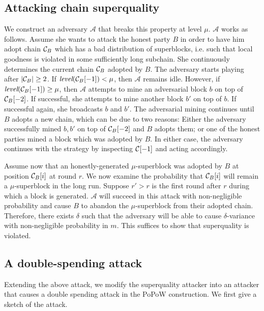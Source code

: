 \subsection{Attacking chain superquality}
\label{subsec.superquality-attack}
We construct an adversary $\mathcal{A}$ that breaks this property at level $\mu$.
$\mathcal{A}$ works as follows. Assume she wants to attack the honest party $B$
in order to have him adopt chain $\mathcal{C}_B$ which has a bad distribution of
superblocks, i.e. such that local goodness is violated in some sufficiently long
subchain. She continuously determines the current chain $\mathcal{C}_B$ adopted by
$B$. The adversary starts playing after $|\mathcal{C}_B| \geq 2$. If
$\textit{level}(\mathcal{C}_B[-1]) < \mu$, then $\mathcal{A}$ remains idle. However,
if $\textit{level}(\mathcal{C}_B[-1]) \geq \mu$, then $\mathcal{A}$ attempts to mine
an adversarial block $b$ on top of $\mathcal{C}_B[-2]$. If successful,  she attempts
to mine another block $b'$ on top of $b$. If successful again, she broadcasts
$b$ and $b'$. The adversarial mining continues until $B$ adopts a new chain,
which can be due to two reasons: Either the adversary successfully mined $b, b'$
on top of $\mathcal{C}_B[-2]$ and $B$ adopts them; or one of the honest parties mined
a block which was adopted by $B$. In either case, the adversary continues with
the strategy by inspecting $\mathcal{C}[-1]$ and acting accordingly.

Assume now that an honestly-generated $\mu$-superblock was adopted by $B$ at
position $\mathcal{C}_B[i]$ at round $r$. We now examine the probability that
$\mathcal{C}_B[i]$ will remain a $\mu$-superblock in the long run. Suppose $r' > r$
is the first round after $r$ during which a block is generated. $\mathcal{A}$
will succeed in this attack with non-negligible probability and cause $B$ to
abandon the $\mu$-superblock from their adopted chain. Therefore, there
exists $\delta$ such that the adversary will be able to cause $\delta$-variance
with non-negligible probability in $m$. This suffices to show that superquality
is violated.

\subsection{A double-spending attack}
Extending the above attack, we modify the superquality attacker into an attacker
that causes a double spending attack in the PoPoW construction. We first give
a sketch of the attack.

